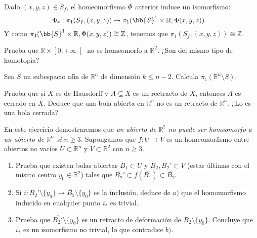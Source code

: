 \begin{ejercicio}
\begin{enumerate}[label=\alph*)]
            Dado $(x,y,z)\in S_f$, el homeomorfismo $\Phi$ anterior induce un isomorfismo:
            \begin{equation*}
                \Phi_\ast:\pi_1(S_f,(x,y,z)) \to \pi_1(\bb{S}^1\times \mathbb{R},\Phi(x,y,z))
            \end{equation*}
            Y como $\pi_1(\bb{S}^1\times \mathbb{R},\Phi(x,y,z))\cong \mathbb{Z}$, tenemos que $\pi_1(S_f,(x,y,z))\cong \mathbb{Z}$.
    \end{enumerate}
\end{ejercicio}

\begin{ejercicio}
    Prueba que $\mathbb{R}\times \left[0,+\infty\right[$ no es homeomorfo a $\mathbb{R}^2$. ¿Son del mismo tipo de homotopía?
\end{ejercicio}

\begin{ejercicio}
    Sea $S$ un subespacio afín de $\mathbb{R}^n$ de dimensión $k\leq n-2$. Calcula $\pi_1(\mathbb{R}^n\setminus S)$.
\end{ejercicio}

\begin{ejercicio}
    Prueba que si $X$ es de Hausdorff y $A\subseteq X$ es un rectracto de $X$, entonces $A$ es cerrado en $X$. Deduce que una bola abierta en $\mathbb{R}^n$ no es un retracto de $\mathbb{R}^n$. ¿Lo es una bola cerrada?
\end{ejercicio}

\begin{ejercicio}
    En este ejercicio demostraremos que \textit{un abierto de $\mathbb{R}^2$ no puede ser homeomorfo a un abierto de $\mathbb{R}^n$ si} $n\geq 3$. Supongamos que $f:U\to V$ es un homeomorfismo entre abiertos no vacíos $U\subset \mathbb{R}^n$ y $V\subset \mathbb{R}^2$ con $n\geq 3$.
    \begin{enumerate}[label=\alph*)]
        \item Prueba que existen bolas abiertas $B_1\subset U$ y $B_2,B_2'\subset V$ (estas últimas con el mismo centro $y_0\in \mathbb{R}^2$) tales que $\overline{B_2'}\subset f(\overline{B_1})\subset \overline{B_2}$.
        \item Si $i:\overline{B_2'}\setminus \{y_0\}\to \overline{B_2}\setminus \{y_0\}$ es la inclusión, deduce de $a)$ que el homomorfismo inducido en cualquier punto $i_\ast$ es trivial.
        \item Prueba que $\overline{B_2'}\setminus \{y_0\}$ es un retracto de deformación de $\overline{B_2}\setminus \{y_0\}$. Concluye que $i_\ast$ es un isomorfismo no trivial, lo que contradice $b)$.
    \end{enumerate}
\end{ejercicio}

